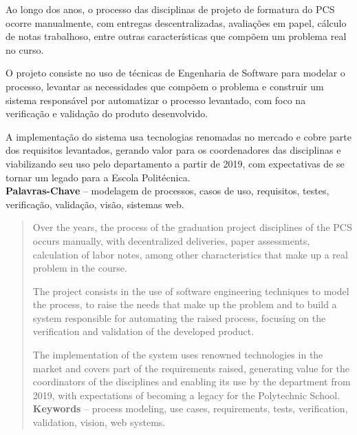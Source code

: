 \documentclass[]{politex}
\begin{document}
\begin{resumo}
Ao longo dos anos, o processo das disciplinas de projeto de formatura do PCS ocorre manualmente, com entregas descentralizadas, avaliações em papel, cálculo de notas trabalhoso, entre outras características que compõem um problema real no curso.

O projeto consiste no uso de técnicas de Engenharia de Software para modelar o processo, levantar as necessidades que compõem o problema e construir um sistema responsável por automatizar o processo levantado, com foco na verificação e validação do produto desenvolvido.

A implementação do sistema usa tecnologias renomadas no mercado e cobre parte dos requisitos levantados, gerando valor para os coordenadores das disciplinas e viabilizando seu uso pelo departamento a partir de 2019, com expectativas de se tornar um legado para a Escola Politécnica.
%
\\[3\baselineskip]
%
\textbf{Palavras-Chave} -- modelagem de processos, casos de uso, requisitos, testes, verificação, validação, visão, sistemas web.
\end{resumo}


\begin{abstract}
Over the years, the process of the graduation project disciplines of the PCS occurs manually, with decentralized deliveries, paper assessments, calculation of labor notes, among other characteristics that make up a real problem in the course.

The project consists in the use of software engineering techniques to model the process, to raise the needs that make up the problem and to build a system responsible for automating the raised process, focusing on the verification and validation of the developed product.

The implementation of the system uses renowned technologies in the market and covers part of the requirements raised, generating value for the coordinators of the disciplines and enabling its use by the department from 2019, with expectations of becoming a legacy for the Polytechnic School.
%
\\[3\baselineskip]
%
\textbf{Keywords} -- process modeling, use cases, requirements, tests, verification, validation, vision, web systems.
\end{abstract}


\listadefiguras
\listadetabelas
\end{document}
